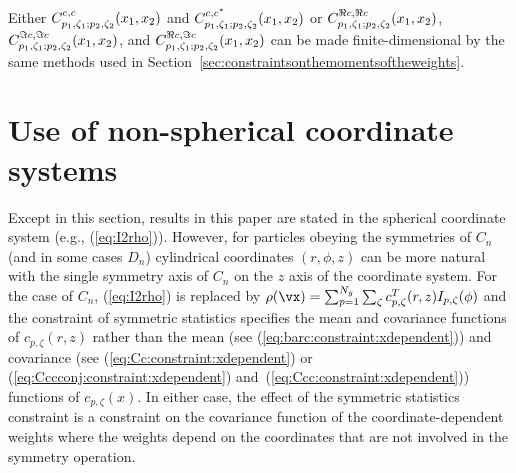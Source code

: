 Either
$C_{p_1,\zeta_1;p_2,\zeta_2}^{c,c}(x_1,x_2)$ and
$C_{p_1,\zeta_1;p_2,\zeta_2}^{c,c^\ast}(x_1,x_2)$
or
$C_{p_1,\zeta_1;p_2,\zeta_2}^{\Re c,\Re c}(x_1,x_2)$,
$C_{p_1,\zeta_1;p_2,\zeta_2}^{\Im c,\Im c}(x_1,x_2)$, and
$C_{p_1,\zeta_1;p_2,\zeta_2}^{\Re c,\Im c}(x_1,x_2)$
can be made finite-dimensional by the same methods used in
Section~\ref{sec:constraintsonthemomentsoftheweights}.
\section{Use of non-spherical coordinate systems}
\label{sec:nonsphericalcoordinatesystems}
Except in this section, results in this paper are stated in the spherical
coordinate system (e.g., (\ref{eq:I2rho})). %
However, for particles obeying the symmetries of $C_n$ (and in some cases
$D_n$)
cylindrical coordinates
$(r,\phi,z)$ can be more natural with the single symmetry axis of $C_n$ on
the $z$ axis of the coordinate system.
For the case of $C_n$, (\ref{eq:I2rho}) %
is replaced by
$\rho(\vx)
=
\sum_{p=1}^{\Ngroup}
\sum_\zeta
c_{p,\zeta}^T(r,z)
I_{p,\zeta}(\phi)$
and the constraint of symmetric statistics specifies the mean and
covariance functions of $c_{p,\zeta}(r,z)$ rather than the mean
(see (\ref{eq:barc:constraint:xdependent})) %
and covariance
(see (\ref{eq:Cc:constraint:xdependent}) or (\ref{eq:Cccconj:constraint:xdependent}) and~(\ref{eq:Ccc:constraint:xdependent}))
functions of $c_{p,\zeta}(x)$.
In either case, the effect of the symmetric statistics constraint is a
constraint on the covariance function of the coordinate-dependent weights
where the weights depend on the coordinates that are not involved in the
symmetry operation.
